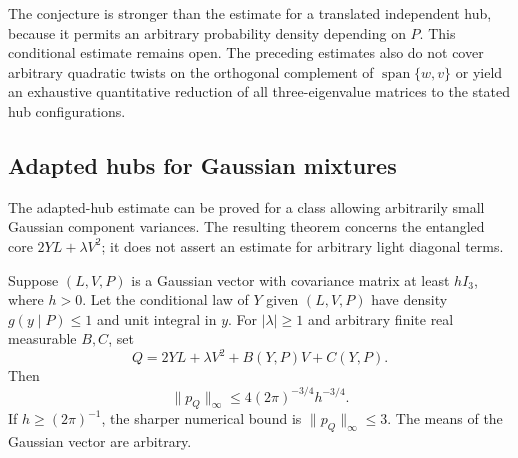 The conjecture is stronger than the estimate for a translated
independent hub, because it permits an arbitrary probability density
depending on $P$.  This conditional estimate remains open.  The
preceding estimates also do not cover arbitrary quadratic twists on
the orthogonal complement of $\operatorname{span}\{w,v\}$ or yield an
exhaustive quantitative reduction of all three-eigenvalue matrices
to the stated hub configurations.

\subsection{Adapted hubs for Gaussian mixtures}

The adapted-hub estimate can be proved for a class allowing arbitrarily
small Gaussian component variances.  The resulting theorem concerns the
entangled core $2YL+\lambda V^2$; it does not assert an estimate for
arbitrary light diagonal terms.

\begin{lemma}\label{lem:hub-gaussian}
Suppose $(L,V,P)$ is a Gaussian vector with covariance matrix at least
$hI_3$, where $h>0$.  Let the conditional law of $Y$ given $(L,V,P)$
have density $g(y\mid P)\le1$ and unit integral in $y$.
For $|\lambda|\ge1$ and arbitrary finite real measurable $B,C$, set
\[
 Q=2YL+\lambda V^2+B(Y,P)V+C(Y,P).
\]
Then
\begin{equation}\label{eq:hub-gaussian-bound}
 \|p_Q\|_\infty\le4(2\pi)^{-3/4}h^{-3/4}.
\end{equation}
If $h\ge(2\pi)^{-1}$, the sharper numerical bound is
$\|p_Q\|_\infty\le3$.
The means of the Gaussian vector are arbitrary.
\end{lemma}

